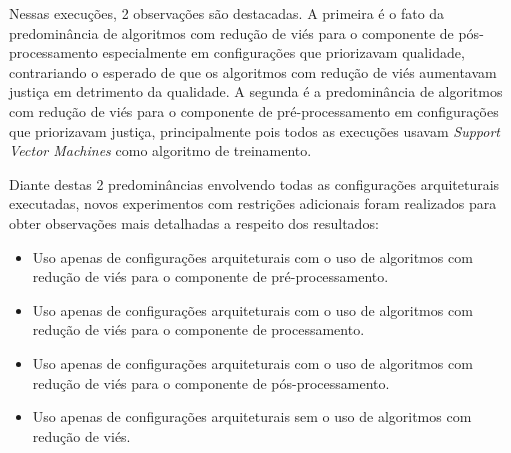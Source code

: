 \documentclass[Portugues,Final]{ic-tese-v3}
\begin{document}
\begin{table}[H]
\begin{center}
  \caption{Melhores configurações escolhidas pelo Gerenciador Autonômico \\ Uso dos algoritmos implementados - 25\% Avaliação/75\% \textit{Fairness}}
\label{tbl:ScoreMAPEKGeral2575}
\end{center}
\end{table}

Nessas execuções, 2 observações são destacadas. A primeira é o fato da predominância de algoritmos com redução de viés para o componente de pós-processamento especialmente em configurações que priorizavam qualidade, contrariando o esperado de que os algoritmos com redução de viés aumentavam justiça em detrimento da qualidade. A segunda é a predominância de algoritmos com redução de viés para o componente de pré-processamento em configurações que priorizavam justiça, principalmente pois todos as execuções usavam \textit{Support Vector Machines} como algoritmo de treinamento.

Diante destas 2 predominâncias envolvendo todas as configurações arquiteturais executadas, novos experimentos com restrições adicionais foram realizados para obter observações mais detalhadas a respeito dos resultados:

\begin{itemize}
\item Uso apenas de configurações arquiteturais com o uso de algoritmos com redução de viés para o componente de \mbox{pré-processamento}.
\item Uso apenas de configurações arquiteturais com o uso de algoritmos com redução de viés para o componente de \mbox{processamento}.
\item Uso apenas de configurações arquiteturais com o uso de algoritmos com redução de viés para o componente de \mbox{pós-processamento}.
\item Uso apenas de configurações arquiteturais sem o uso de algoritmos com redução de viés.
\end{itemize}
\end{document}
